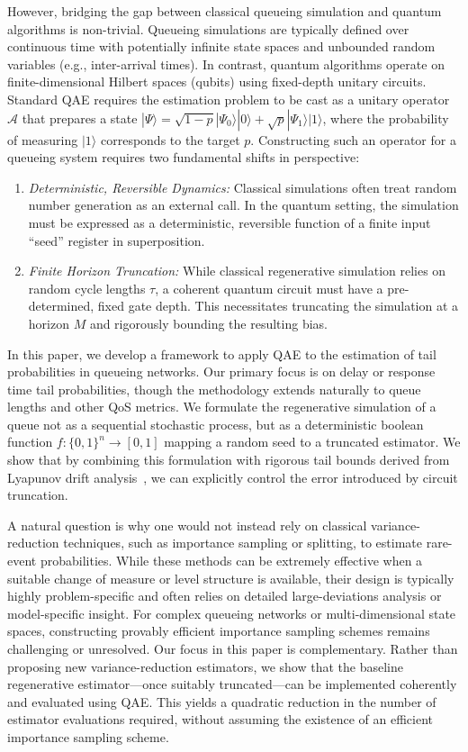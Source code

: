\documentclass[11pt]{article}
\begin{document}
However, bridging the gap between classical queueing simulation and quantum algorithms is non-trivial. Queueing simulations are typically defined over continuous time with potentially infinite state spaces and unbounded random variables (e.g., inter-arrival times). In contrast, quantum algorithms operate on finite-dimensional Hilbert spaces (qubits) using fixed-depth unitary circuits. Standard QAE requires the estimation problem to be cast as a unitary operator $\mathcal{A}$ that prepares a state $|\Psi\rangle=\sqrt{1-p}|\Psi_{0}\rangle|0\rangle+\sqrt{p}|\Psi_{1}\rangle|1\rangle$, where the probability of measuring $|1\rangle$ corresponds to the target $p$. Constructing such an operator for a queueing system requires two fundamental shifts in perspective:
\begin{enumerate}
    \item \textit{Deterministic, Reversible Dynamics:} Classical simulations often treat random number generation as an external call. In the quantum setting, the simulation must be expressed as a deterministic, reversible function of a finite input ``seed'' register in superposition.
    \item \textit{Finite Horizon Truncation:} While classical regenerative simulation relies on random cycle lengths $\tau$, a coherent quantum circuit must have a pre-determined, fixed gate depth. This necessitates truncating the simulation at a horizon $M$ and rigorously bounding the resulting bias.
\end{enumerate}

In this paper, we develop a framework to apply QAE to the estimation of tail probabilities in queueing networks. Our primary focus is on delay or response time tail probabilities, though the methodology extends naturally to queue lengths and other QoS metrics. We formulate the regenerative simulation of a queue not as a sequential stochastic process, but as a deterministic boolean function $f:\{0,1\}^{n}\rightarrow[0,1]$ mapping a random seed to a truncated estimator. We show that by combining this formulation with rigorous tail bounds derived from Lyapunov drift analysis~\cite{hajek1982hitting, meyn1993stability, meyn2009markov}, we can explicitly control the error introduced by circuit truncation.

A natural question is why one would not instead rely on classical variance-reduction techniques, such as importance sampling or splitting, to estimate rare-event probabilities. While these methods can be extremely effective when a suitable change of measure or level structure is available, their design is typically highly problem-specific and often relies on detailed large-deviations analysis or model-specific insight. For complex queueing networks or multi-dimensional state spaces, constructing provably efficient importance sampling schemes remains challenging or unresolved. Our focus in this paper is complementary. Rather than proposing new variance-reduction estimators, we show that the baseline regenerative estimator—once suitably truncated—can be implemented coherently and evaluated using QAE. This yields a quadratic reduction in the number of estimator evaluations required, without assuming the existence of an efficient importance sampling scheme.
\end{document}
